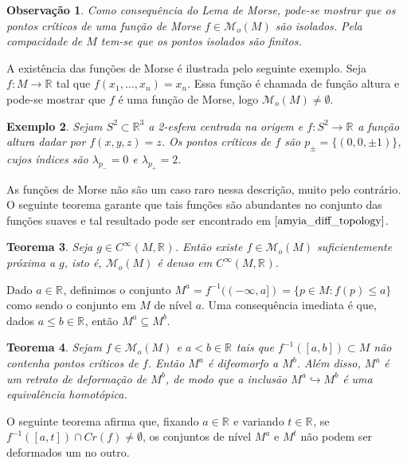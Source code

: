 \documentclass[12pt]{book}
\newtheorem{teorema}{Teorema}[section]
\newtheorem{exemplo}[teorema]{Exemplo}
\newtheorem{observacao}[teorema]{Observação}
\newcommand{\funcoesmorse}[1]{\mathcal{M}_{o}(#1)}
\newcommand{\funcoessuaves}[1]{C^{\infty}(#1, \real{})}
\newcommand{\pontoscriticos}[1]{\textit{Cr}(#1)}
\newcommand{\real}[1]{\mathbb{R}^{#1}}
\newcommand{\reta}{\real{}}
\begin{document}
	\begin{observacao}
		Como consequência do Lema de Morse, pode-se mostrar que os pontos críticos de uma função de Morse $f \in \funcoesmorse{M}$ são isolados. Pela compacidade de $M$ tem-se que os pontos isolados são finitos.
	\end{observacao}
	
	
	A existência das funções de Morse é ilustrada pelo seguinte exemplo. Seja $f:M\to \reta$ tal que $f(x_{1}, \dots, x_{n}) = x_{n}$. Essa função é chamada de função altura e pode-se mostrar que $f$ é uma função de Morse, logo $\funcoesmorse{M} \neq \emptyset$.
	
	\begin{exemplo}
		Sejam $S^{2} \subset \real{3}$ a 2-esfera centrada na origem e $f:S^{2}\to \reta$ a função altura dadar por $f(x,y,z) = z$. Os pontos críticos de $f$ são $p_{\pm} = \{(0,0,\pm 1)\}$, cujos índices são $\lambda_{p_{-} } = 0$ e $\lambda_{p_{+}} = 2$.
	\end{exemplo}
	
	As funções de Morse não são um caso raro nessa descrição, muito pelo contrário. O seguinte teorema garante que tais funções são abundantes no conjunto das funções suaves e tal resultado pode ser encontrado em $\cite{amyia_diff_topology}$.
	
	\begin{teorema}
		Seja $g\in \funcoessuaves{M}$. Então existe $f \in \funcoesmorse{M}$ suficientemente próxima a $g$, isto é, $\funcoesmorse{M}$ é denso em $\funcoessuaves{M}$.
	\end{teorema} 
	
	Dado $a \in \reta$, definimos o conjunto $M^{a}= f^{-1}((-\infty, a]) = \{p \in M: f(p)\leq a\}$ como sendo o conjunto em $M$ de nível $a$. Uma consequência imediata é que, dados $a\leq b \in \reta$, então $M^{a} \subseteq M^{b}$.
	
	\begin{teorema}
		Sejam $f \in \funcoesmorse{M}$ e $a<b \in \reta$ tais que $f^{-1}([a,b])\subset M$ não contenha pontos críticos de $f$. Então $M^{a}$ é difeomorfo a $M^{b}$. Além disso, $M^{a}$ é um retrato de deformação de $M^{b}$, de modo que a inclusão  $M^{a} \hookrightarrow M^{b}$ é uma equivalência homotópica.
	\end{teorema}
	
	O seguinte teorema afirma que, fixando $a \in \reta$ e variando $t \in \reta$, se $f^{-1}([a,t]) \cap \pontoscriticos{f} \neq \emptyset$, os conjuntos de nível $M^{a}$ e $M^{t}$ não podem ser deformados um no outro.
	
\end{document}

